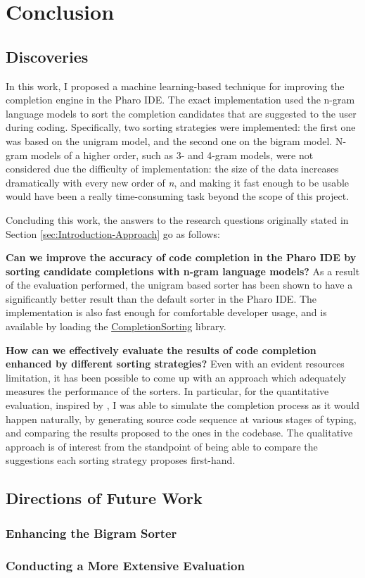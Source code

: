 \chapter{Conclusion}
\label{chap:Conclusion}
\section{Discoveries}
\label{sec:Conclusion-Discoveries}
In this work, I proposed a machine learning-based technique for improving the completion engine in the Pharo IDE. The exact implementation used the n-gram language models to sort the completion candidates that are suggested to the user during coding. Specifically, two sorting strategies were implemented: the first one was based on the unigram model, and the second one on the bigram model. N-gram models of a higher order, such as 3- and 4-gram models, were not considered due the difficulty of implementation: the size of the data increases dramatically with every new order of \textit{n}, and making it fast enough to be usable would have been a really time-consuming task beyond the scope of this project.

Concluding this work, the answers to the research questions originally stated in Section \ref{sec:Introduction-Approach} go as follows:
\begin{RQ}
    \item \textbf{Can we improve the accuracy of code completion in the Pharo IDE by sorting candidate completions with n-gram language models?} As a result of the evaluation performed, the unigram based sorter has been shown to have a significantly better result than the default sorter in the Pharo IDE. The implementation is also fast enough for comfortable developer usage, and is available by loading the \href{https://github.com/myroslavarm/CompletionSorting}{CompletionSorting} library.
    \item \textbf{How can we effectively evaluate the results of code completion enhanced by different sorting strategies?} Even with an evident resources limitation, it has been possible to come up with an approach which adequately measures the performance of the sorters. In particular, for the quantitative evaluation, inspired by \cite{Robb08a}, I was able to simulate the completion process as it would happen naturally, by generating source code sequence at various stages of typing, and comparing the results proposed to the ones in the codebase. The qualitative approach is of interest from the standpoint of being able to compare the suggestions each sorting strategy proposes first-hand.
\end{RQ}

\section{Directions of Future Work}
\label{sec:Conclusion-FutureWork}
\subsection{Enhancing the Bigram Sorter}

\subsection{Conducting a More Extensive Evaluation}